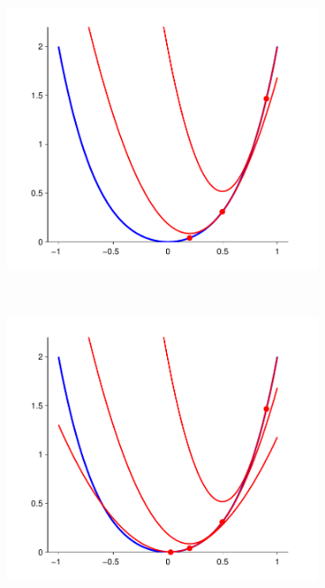 \begin{figure}
\begin{subfigure}[b]{0.2\textwidth}
		\includegraphics[width=\textwidth]{./lecture7/Newton2}
	\end{subfigure}
	~
	\begin{subfigure}[b]{0.2\textwidth}
		\includegraphics[width=\textwidth]{./lecture7/Newton3}
	\end{subfigure}
	\\
	\begin{subfigure}[b]{0.2\textwidth}

\end{subfigure}
\end{figure}
